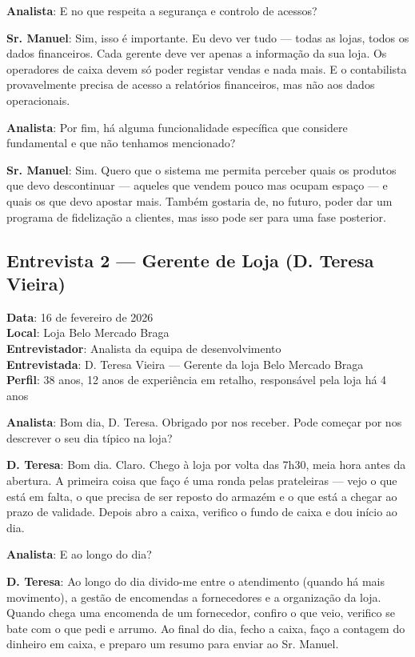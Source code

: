 \documentclass[a4paper,12pt]{scrreprt}
\begin{document}
\textbf{Analista}: E no que respeita a segurança e controlo de acessos?

\textbf{Sr. Manuel}: Sim, isso é importante. Eu devo ver tudo --- todas as lojas, todos os dados financeiros. Cada gerente deve ver apenas a informação da sua loja. Os operadores de caixa devem só poder registar vendas e nada mais. E o contabilista provavelmente precisa de acesso a relatórios financeiros, mas não aos dados operacionais.

\textbf{Analista}: Por fim, há alguma funcionalidade específica que considere fundamental e que não tenhamos mencionado?

\textbf{Sr. Manuel}: Sim. Quero que o sistema me permita perceber quais os produtos que devo descontinuar --- aqueles que vendem pouco mas ocupam espaço --- e quais os que devo apostar mais. Também gostaria de, no futuro, poder dar um programa de fidelização a clientes, mas isso pode ser para uma fase posterior.

\subsection*{Entrevista 2 --- Gerente de Loja (D. Teresa Vieira)}
\textbf{Data}: 16 de fevereiro de 2026\\
\textbf{Local}: Loja Belo Mercado Braga\\
\textbf{Entrevistador}: Analista da equipa de desenvolvimento\\
\textbf{Entrevistada}: D. Teresa Vieira --- Gerente da loja Belo Mercado Braga\\
\textbf{Perfil}: 38 anos, 12 anos de experiência em retalho, responsável pela loja há 4 anos

\textbf{Analista}: Bom dia, D. Teresa. Obrigado por nos receber. Pode começar por nos descrever o seu dia típico na loja?

\textbf{D. Teresa}: Bom dia. Claro. Chego à loja por volta das 7h30, meia hora antes da abertura. A primeira coisa que faço é uma ronda pelas prateleiras --- vejo o que está em falta, o que precisa de ser reposto do armazém e o que está a chegar ao prazo de validade. Depois abro a caixa, verifico o fundo de caixa e dou início ao dia.

\textbf{Analista}: E ao longo do dia?

\textbf{D. Teresa}: Ao longo do dia divido-me entre o atendimento (quando há mais movimento), a gestão de encomendas a fornecedores e a organização da loja. Quando chega uma encomenda de um fornecedor, confiro o que veio, verifico se bate com o que pedi e arrumo. Ao final do dia, fecho a caixa, faço a contagem do dinheiro em caixa, e preparo um resumo para enviar ao Sr. Manuel.
\end{document}
